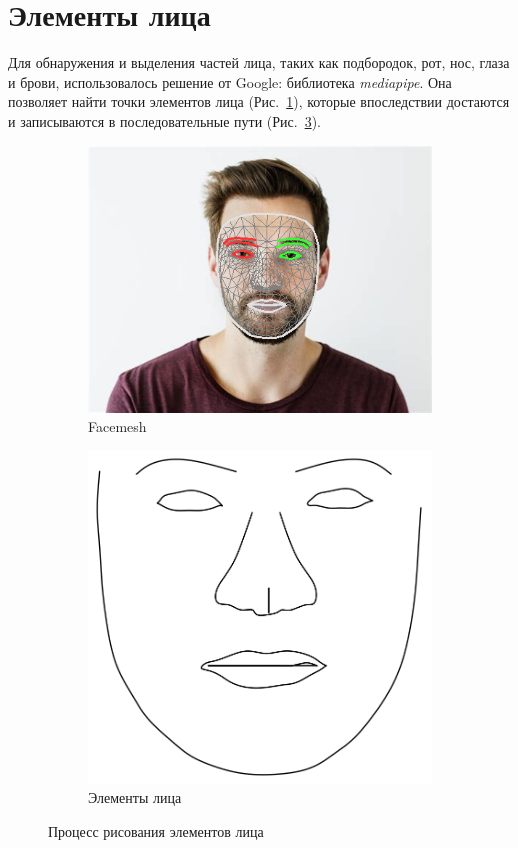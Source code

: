 \documentclass[a4paper, 11pt]{article}
\title{}
\author{}
\begin{document}
\section{Элементы лица}
Для обнаружения и выделения частей лица, таких как подбородок, рот, нос, глаза и брови, использовалось решение от Google: библиотека \textit{mediapipe}. Она позволяет найти точки элементов лица (Рис.~\ref{facemesh}), которые впоследствии достаются и записываются в последовательные пути (Рис.~\ref{face_elements}). 

\begin{figure}[h!]
	\centering
	\begin{subfigure}{0.49\linewidth}
			\includegraphics[width=\linewidth]{"mask_ex.png"}
		\caption{Facemesh} \label{facemesh}
	\end{subfigure}
	\begin{subfigure}{0.49\linewidth}
		\includegraphics[width=\linewidth]{"mask_.png"}
		\caption{Элементы лица} \label{face_elements}
	\end{subfigure}
	\caption{Процесс рисования элементов лица}
\end{figure}
\end{document}
